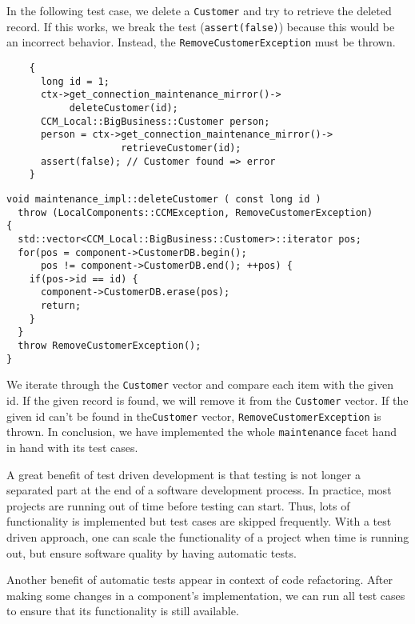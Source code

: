 In the following test case, we delete a {\tt Customer} and try to retrieve the 
deleted record.
If this works, we break the test ({\tt assert(false)}) because this would be an
incorrect behavior. 
Instead, the {\tt RemoveCustomerException} must be thrown.
\begin{small}
\begin{verbatim}
    {
      long id = 1;
      ctx->get_connection_maintenance_mirror()->
           deleteCustomer(id);
      CCM_Local::BigBusiness::Customer person;
      person = ctx->get_connection_maintenance_mirror()->
                    retrieveCustomer(id);
      assert(false); // Customer found => error
    }
\end{verbatim}
\end{small}

\begin{small}
\begin{verbatim}
void maintenance_impl::deleteCustomer ( const long id )
  throw (LocalComponents::CCMException, RemoveCustomerException)
{
  std::vector<CCM_Local::BigBusiness::Customer>::iterator pos;
  for(pos = component->CustomerDB.begin(); 
      pos != component->CustomerDB.end(); ++pos) {
    if(pos->id == id) {
      component->CustomerDB.erase(pos);
      return;
    }
  }
  throw RemoveCustomerException();  
}
\end{verbatim}
\end{small}

We iterate through the {\tt Customer} vector and compare 
each item with the given id.
If the given record is found, we will remove it from the {\tt Customer} vector.
If the given id can't be found in the{\tt Customer} vector, 
{\tt RemoveCustomerException} is thrown.
In conclusion, we have implemented the whole {\tt maintenance} facet hand in 
hand with its test cases. 

\vspace{3mm}
A great benefit of test driven development is that testing is not longer a 
separated part at the end of a software development process.
In practice, most projects are running out of time before testing can start. 
Thus, lots of functionality is implemented but test cases are skipped 
frequently.
With a test driven approach, one can scale the functionality of a project when 
time is running out, but ensure software quality by having automatic tests.

Another benefit of automatic tests appear in context of code refactoring. 
After making some changes in a component's implementation, we can run all test 
cases to ensure that its functionality is still available.


